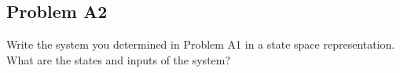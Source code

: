 \subsection{Problem A2}
    Write the system you determined in Problem A1 in a state space representation. What are the states and inputs of the system?
    
